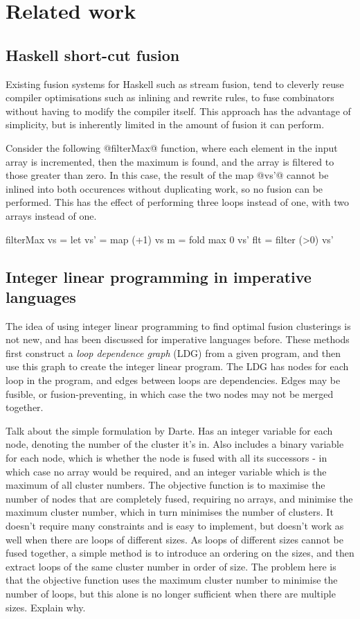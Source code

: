 \documentclass[preprint]{sigplanconf}
\begin{document}
\section{Related work}

\subsection{Haskell short-cut fusion}
Existing fusion systems for Haskell such as stream fusion\cite{coutts2007streamfusion}, tend to cleverly reuse compiler optimisations such as inlining and rewrite rules, to fuse combinators without having to modify the compiler itself.
This approach has the advantage of simplicity, but is inherently limited in the amount of fusion it can perform.

Consider the following @filterMax@ function, where each element in the input array is incremented, then the maximum is found, and the array is filtered to those greater than zero.
In this case, the result of the map @vs'@ cannot be inlined into both occurences without duplicating work, so no fusion can be performed.
This has the effect of performing three loops instead of one, with two arrays instead of one.

\begin{code}
filterMax vs =
 let vs' = map    (+1)  vs
     m   = fold   max 0 vs'
     flt = filter (>0)  vs'
\end{code}

\subsection{Integer linear programming in imperative languages}
The idea of using integer linear programming to find optimal fusion clusterings is not new, and has been discussed for imperative languages before.
These methods first construct a \emph{loop dependence graph} (LDG) from a given program, and then use this graph to create the integer linear program.
The LDG has nodes for each loop in the program, and edges between loops are dependencies.
Edges may be fusible, or fusion-preventing, in which case the two nodes may not be merged together.

Talk about the simple formulation by Darte\cite{darte2002new}.
Has an integer variable for each node, denoting the number of the cluster it's in.
Also includes a binary variable for each node, which is whether the node is fused with all its successors - in which case no array would be required, and an integer variable which is the maximum of all cluster numbers.
The objective function is to maximise the number of nodes that are completely fused, requiring no arrays, and minimise the maximum cluster number, which in turn minimises the number of clusters.
It doesn't require many constraints and is easy to implement, but doesn't work as well when there are loops of different sizes.
As loops of different sizes cannot be fused together, a simple method is to introduce an ordering on the sizes, and then extract loops of the same cluster number in order of size.
The problem here is that the objective function uses the maximum cluster number to minimise the number of loops, but this alone is no longer sufficient when there are multiple sizes. Explain why.
\end{document}
